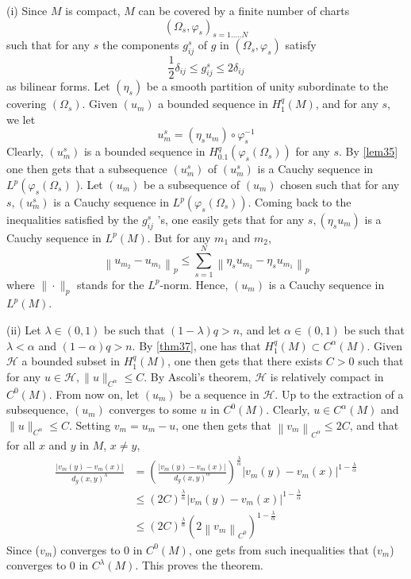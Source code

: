 \documentclass[12pt,hyperref,a4paper,UTF8]{ctexart}
\begin{document}
\begin{Proof1}
    (i) Since $M$ is compact, $M$ can be covered by a finite number of charts
$$
\left(\Omega_s, \varphi_s\right)_{s=1 \ldots . . N}
$$
such that for any $s$ the components $g_{i j}^s$ of $g$ in $\left(\Omega_s, \varphi_s\right)$ satisfy
$$
\frac{1}{2} \delta_{i j} \leq g_{i j}^s \leq 2 \delta_{i j}
$$
as bilinear forms. Let $\left(\eta_s\right)$ be a smooth partition of unity subordinate to the covering $\left(\Omega_s\right)$. Given $\left(u_m\right)$ a bounded sequence in $H_1^q(M)$, and for any $s$, we let
$$
u_m^s=\left(\eta_s u_m\right) \circ \varphi_s^{-1}
$$
Clearly, $\left(u_m^s\right)$ is a bounded sequence in $H_{0.1}^q\left(\varphi_s\left(\Omega_s\right)\right)$ for any $s$. By \autoref{lem35} one then gets that a subsequence $\left(u_m^s\right)$ of $\left(u_m^s\right)$ is a Cauchy sequence in $L^p\left(\varphi_s\left(\Omega_s\right)\right.$ ). Let $\left(u_m\right)$ be a subsequence of $\left(u_m\right)$ chosen such that for any $s,\left(u_m^s\right)$ is a Cauchy sequence in $L^p\left(\varphi_s\left(\Omega_s\right)\right)$. Coming back to the inequalities satisfied by the $g_{i j}^s$ 's, one easily gets that for any $s,\left(\eta_s u_m\right)$ is a Cauchy sequence in $L^p(M)$. But for any $m_1$ and $m_2$,
$$
\left\|u_{m_2}-u_{m_1}\right\|_p \leq \sum_{s=1}^N\left\|\eta_s u_{m_2}-\eta_s u_{m_1}\right\|_p
$$
where $\|\cdot\|_p$ stands for the $L^p$-norm. Hence, $\left(u_m\right)$ is a Cauchy sequence in $L^p(M)$. 

\vskip 3pt
(ii) Let $\lambda \in(0,1)$ be such that $(1-\lambda) q>n$, and let $\alpha \in(0,1)$ be such that $\lambda<\alpha$ and $(1-\alpha) q>n$. 
By \autoref{thm37}, one has that $H_1^q(M) \subset C^\alpha(M)$. Given $\mathcal{H}$ a bounded subset in $H_1^q(M)$, one then gets that there exists $C>0$ such that for any $u \in \mathcal{H},\|u\|_{C^\alpha} \leq C$. By Ascoli's theorem, $\mathcal{H}$ is relatively compact in $C^0(M)$. From now on, let $\left(u_m\right)$ be a sequence in $\mathcal{H}$. Up to the extraction of a subsequence, $\left(u_m\right)$ converges to some $u$ in $C^0(M)$. Clearly, $u \in C^\alpha(M)$ and $\|u\|_{C^\alpha} \leq C$. Setting $v_m=u_m-u$, one then gets that $\left\|v_m\right\|_{C^\alpha} \leq 2 C$, and that for all $x$ and $y$ in $M$, $x \neq y$,
$$
\begin{aligned}
\frac{\left|v_m(y)-v_m(x)\right|}{d_g(x, y)^\lambda} & =\left(\frac{\left|v_m(y)-v_m(x)\right|}{d_g(x, y)^\alpha}\right)^{\frac{\lambda}{\alpha}}\left|v_m(y)-v_m(x)\right|^{1-\frac{\lambda}{\alpha}} \\
& \leq(2 C)^{\frac{\lambda}{\alpha}}\left|v_m(y)-v_m(x)\right|^{1-\frac{\lambda}{\alpha}} \\
& \leq(2 C)^{\frac{\lambda}{\alpha}}\left(2\left\|v_m\right\|_{C^0}\right)^{1-\frac{\lambda}{\alpha}}
\end{aligned}
$$
Since ($v_m$) converges to 0 in $C^0(M)$, one gets from such inequalities that ($v_m$) converges to 0 in $C^\lambda(M)$. This proves the theorem.
\end{Proof1}
\end{document}
